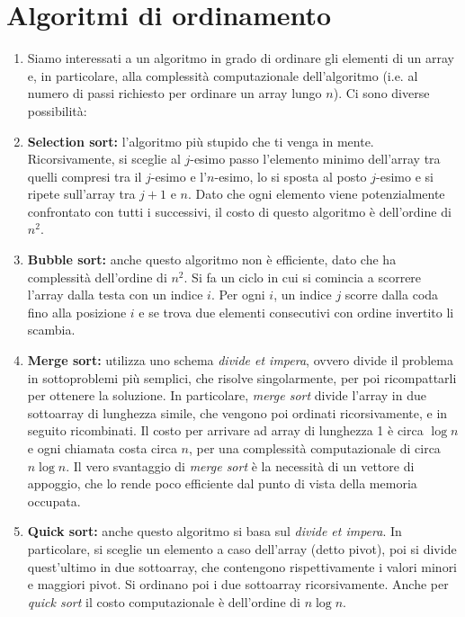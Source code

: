 \documentclass[a4paper,11pt]{article}
\begin{document}
\section{Algoritmi di ordinamento}
\begin{enumerate}[resume]
	\item Siamo interessati a un algoritmo in grado di ordinare gli elementi di un array e, in particolare, alla complessità computazionale dell'algoritmo (i.e. al numero di passi richiesto per ordinare un array lungo $n$). Ci sono diverse possibilità:
	\item\textbf{Selection sort:} l'algoritmo più stupido che ti venga in mente. Ricorsivamente, si sceglie al $j$-esimo passo l'elemento minimo dell'array tra quelli compresi tra il $j$-esimo e l'$n$-esimo, lo si sposta al posto $j$-esimo e si ripete sull'array tra $j+1$ e $n$. Dato che ogni elemento viene potenzialmente confrontato con tutti i successivi, il costo di questo algoritmo è dell'ordine di $n^2$.
	\item\textbf{Bubble sort:} anche questo algoritmo non è efficiente, dato che ha complessità dell'ordine di $n^2$. Si fa un ciclo in cui si comincia a scorrere l'array dalla testa con un indice $i$. Per ogni $i$, un indice $j$ scorre dalla coda fino alla posizione $i$ e se trova due elementi consecutivi con ordine invertito li scambia.
	\item\textbf{Merge sort:} utilizza uno schema \textit{divide et impera}, ovvero divide il problema in sottoproblemi più semplici, che risolve singolarmente, per poi ricompattarli per ottenere la soluzione. In particolare, \textit{merge sort} divide l'array in due sottoarray di lunghezza simile, che vengono poi ordinati ricorsivamente, e in seguito ricombinati. Il costo per arrivare ad array di lunghezza 1 è circa $\log n$ e ogni chiamata costa circa $n$, per una complessità computazionale di circa $n\log n$. Il vero svantaggio di \textit{merge sort} è la necessità di un vettore di appoggio, che lo rende poco efficiente dal punto di vista della memoria occupata.
	\item\textbf{Quick sort:} anche questo algoritmo si basa sul \textit{divide et impera}. In particolare, si sceglie un elemento a caso dell'array (detto pivot), poi si divide quest'ultimo in due sottoarray, che contengono rispettivamente i valori minori e maggiori pivot. Si ordinano poi i due sottoarray ricorsivamente. Anche per \textit{quick sort} il costo computazionale è dell'ordine di $n\log n$.
\end{enumerate}
\end{document}
